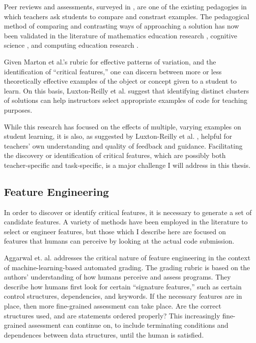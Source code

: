 \documentclass[12pt]{article}
\begin{document}
Peer reviews and assessments, surveyed in \cite{peerReview98}, are one of the existing pedagogies in which teachers ask students to compare and constrast examples. The pedagogical method of comparing and contrasting ways of approaching a solution has now been validated in the literature of mathematics education research \cite{Star07}, cognitive science \cite{loewenstein2003analogical,kurtz01learning,telling}, and computing education research \cite{Suhonen08, PatitsasICER13}.

Given Marton et al.'s rubric for effective patterns of variation, and the identification of ``critical features,'' one can discern between more or less theoretically effective examples of the object or concept given to a student to learn. On this basis, Luxton-Reilly et al. \cite{Luxton13} suggest that identifying distinct clusters of solutions can help instructors select appropriate examples of code for teaching purposes. 

While this research has focused on the effects of multiple, varying examples on student learning, it is also, as suggested by Luxton-Reilly et al. \cite{Luxton13}, helpful for teachers' own understanding and quality of feedback and guidance. Facilitating the discovery or identification of critical features, which are possibly both teacher-specific and task-specific, is a major challenge I will address in this thesis.

\subsection{Feature Engineering}

In order to discover or identify critical features, it is necessary to generate a set of candidate features. A variety of methods have been employed in the literature to select or engineer features, but those which I describe here are focused on features that humans can perceive by looking at the actual code submission.

Aggarwal et. al. \cite{aggarwalprinciples} addresses the critical nature of feature engineering in the context of machine-learning-based automated grading. The grading rubric is based on the authors' understanding of how humans perceive and assess programs. They describe how humans first look for certain ``signature features,'' such as certain control structures, dependencies, and keywords. If the necessary features are in place, then more fine-grained assessment can take place. Are the correct structures used, and are statements ordered properly? This increasingly fine-grained assessment can continue on, to include terminating conditions and dependences between data structures, until the human is satisfied. 
\end{document}
